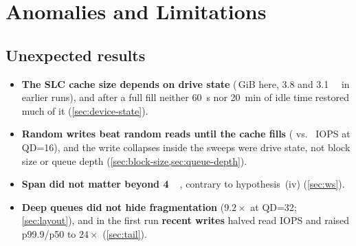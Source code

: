 \section{Anomalies and Limitations}\label{sec:anomalies}

\subsection{Unexpected results}
\begin{itemize}
  \item \textbf{The SLC cache size depends on drive state}
        (\,GiB here, \qty{3.8}{} and \qty{3.1}{\gibi\byte} in
        earlier runs), and after a full fill neither \qty{60}{\second} nor \qty{20}{\minute} of idle time
        restored much of it (\cref{sec:device-state}).
  \item \textbf{Random writes beat random reads until the cache fills}
        ( vs.\  IOPS at QD=16), and
        the write collapses inside the sweeps were drive state, not block size or queue depth
        (\cref{sec:block-size,sec:queue-depth}).
  \item \textbf{Span did not matter beyond \qty{4}{\gibi\byte}}, contrary to hypothesis~(iv)
        (\cref{sec:ws}).
  \item \textbf{Deep queues did not hide fragmentation} ($9.2\times$ at QD=32; \cref{sec:layout}), and in
        the first run \textbf{recent writes} halved read IOPS and raised p99.9/p50 to $24\times$
        (\cref{sec:tail}).
\end{itemize}

